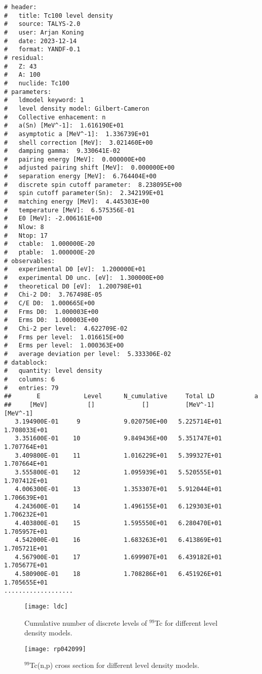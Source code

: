 \begin{samplecase}
{\begin{verbatim}
# header:
#   title: Tc100 level density
#   source: TALYS-2.0
#   user: Arjan Koning
#   date: 2023-12-14
#   format: YANDF-0.1
# residual:
#   Z: 43
#   A: 100
#   nuclide: Tc100
# parameters:
#   ldmodel keyword: 1
#   level density model: Gilbert-Cameron
#   Collective enhacement: n
#   a(Sn) [MeV^-1]:  1.616190E+01
#   asymptotic a [MeV^-1]:  1.336739E+01
#   shell correction [MeV]:  3.021460E+00
#   damping gamma:  9.330641E-02
#   pairing energy [MeV]:  0.000000E+00
#   adjusted pairing shift [MeV]:  0.000000E+00
#   separation energy [MeV]:  6.764404E+00
#   discrete spin cutoff parameter:  8.238095E+00
#   spin cutoff parameter(Sn):  2.342199E+01
#   matching energy [MeV]:  4.445303E+00
#   temperature [MeV]:  6.575356E-01
#   E0 [MeV]: -2.006161E+00
#   Nlow: 8
#   Ntop: 17
#   ctable:  1.000000E-20
#   ptable:  1.000000E-20
# observables:
#   experimental D0 [eV]:  1.200000E+01
#   experimental D0 unc. [eV]:  1.300000E+00
#   theoretical D0 [eV]:  1.200798E+01
#   Chi-2 D0:  3.767498E-05
#   C/E D0:  1.000665E+00
#   Frms D0:  1.000003E+00
#   Erms D0:  1.000003E+00
#   Chi-2 per level:  4.622709E-02
#   Frms per level:  1.016615E+00
#   Erms per level:  1.000363E+00
#   average deviation per level:  5.333306E-02
# datablock:
#   quantity: level density
#   columns: 6
#   entries: 79
##       E            Level      N_cumulative     Total LD           a      
##     [MeV]           []             []          [MeV^-1]       [MeV^-1]  
   3.194900E-01     9            9.020750E+00   5.225714E+01   1.708033E+01
   3.351600E-01    10            9.849436E+00   5.351747E+01   1.707764E+01
   3.409800E-01    11            1.016229E+01   5.399327E+01   1.707664E+01
   3.555800E-01    12            1.095939E+01   5.520555E+01   1.707412E+01
   4.006300E-01    13            1.353307E+01   5.912044E+01   1.706639E+01
   4.243600E-01    14            1.496155E+01   6.129303E+01   1.706232E+01
   4.403800E-01    15            1.595550E+01   6.280470E+01   1.705957E+01
   4.542000E-01    16            1.683263E+01   6.413869E+01   1.705721E+01
   4.567900E-01    17            1.699907E+01   6.439182E+01   1.705677E+01
   4.580900E-01    18            1.708286E+01   6.451926E+01   1.705655E+01
...................
\end{verbatim} } \renewcommand{\baselinestretch}{1.07}\small\normalsize
\noindent

\end{samplecase}
\begin{figure}
\centering\texttt{[image: ldc]}
\caption{Cumulative number of discrete levels of $^{99}$Tc for different 
level density models.}
\label{tccum}
\end{figure}
\begin{figure}
\centering\texttt{[image: rp042099]}
\caption{$^{99}$Tc(n,p) cross section for different 
level density models.}
\label{tcnp}
\end{figure}
